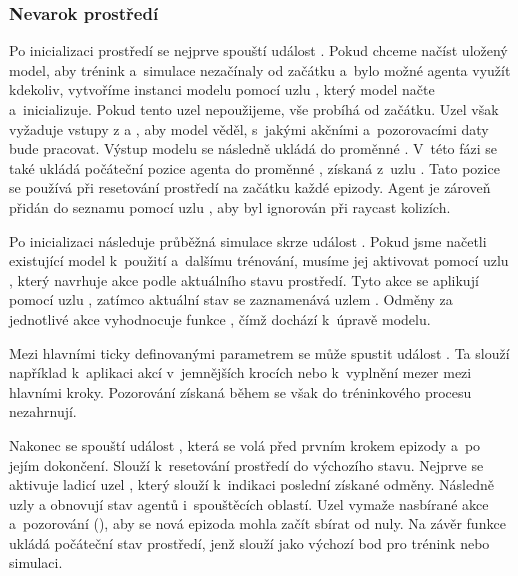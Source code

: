 \newpage

\subsubsection{Nevarok prostředí}
Po inicializaci prostředí se nejprve spouští událost . Pokud chceme načíst uložený model, aby trénink a~simulace nezačínaly od začátku a~bylo možné agenta využít kdekoliv, vytvoříme instanci modelu pomocí uzlu , který model načte a~inicializuje. Pokud tento uzel nepoužijeme, vše probíhá od začátku. Uzel však vyžaduje vstupy z  a , aby model věděl, s~jakými akčními a~pozorovacími daty bude pracovat. Výstup modelu se následně ukládá do proměnné . V~této fázi se také ukládá počáteční pozice agenta do proměnné , získaná z~uzlu . Tato pozice se používá při resetování prostředí na začátku každé epizody. Agent je zároveň přidán do seznamu  pomocí uzlu , aby byl ignorován při raycast kolizích.

Po inicializaci následuje průběžná simulace skrze událost . Pokud jsme načetli existující model k~použití a~dalšímu trénování, musíme jej aktivovat pomocí uzlu , který navrhuje akce podle aktuálního stavu prostředí. Tyto akce se aplikují pomocí uzlu , zatímco aktuální stav se zaznamenává uzlem . Odměny za jednotlivé akce vyhodnocuje funkce , čímž dochází k~úpravě modelu.

Mezi hlavními ticky definovanými parametrem  se může spustit událost . Ta slouží například k~aplikaci akcí v~jemnějších krocích nebo k~vyplnění mezer mezi hlavními kroky. Pozorování získaná během  se však do tréninkového procesu nezahrnují.

Nakonec se spouští událost , která se volá před prvním krokem epizody a~po jejím dokončení. Slouží k~resetování prostředí do výchozího stavu. Nejprve se aktivuje ladicí uzel , který slouží k~indikaci poslední získané odměny. Následně uzly  a  obnovují stav agentů i~spouštěcích oblastí. Uzel  vymaže nasbírané akce a~pozorování (), aby se nová epizoda mohla začít sbírat od nuly. Na závěr funkce  ukládá počáteční stav prostředí, jenž slouží jako výchozí bod pro trénink nebo simulaci.

